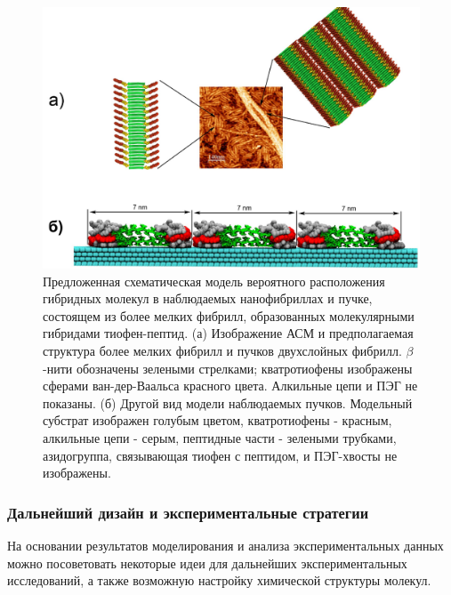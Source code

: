 \begin{figure} [H]
    \centering
    \includegraphics[width=\textwidth]{images/p4/punkt5/part4_p5_f55.pdf}
    \caption[Предложенная схематическая модель вероятного расположения гибридных молекул в наблюдаемых нанофибриллах]{Предложенная схематическая модель вероятного расположения гибридных молекул в наблюдаемых нанофибриллах и пучке, состоящем из более мелких фибрилл, образованных молекулярными гибридами тиофен-пептид. (а) Изображение АСМ и предполагаемая структура более мелких фибрилл и пучков двухслойных фибрилл. $\beta$-нити обозначены зелеными стрелками; кватротиофены изображены сферами ван-дер-Ваальса красного цвета. Алкильные цепи и ПЭГ не показаны. (б) Другой вид модели наблюдаемых пучков. Модельный субстрат изображен голубым цветом, кватротиофены - красным, алкильные цепи - серым, пептидные части - зелеными трубками, азидогруппа, связывающая тиофен с пептидом, и ПЭГ-хвосты не изображены.}
    \label{fig:p4_p5_f55}
\end{figure}
    
    
\subsubsection{Дальнейший дизайн и экспериментальные стратегии}
    
    На основании результатов моделирования и анализа экспериментальных данных можно посоветовать некоторые идеи для дальнейших экспериментальных исследований, а также возможную настройку химической структуры молекул.
    

